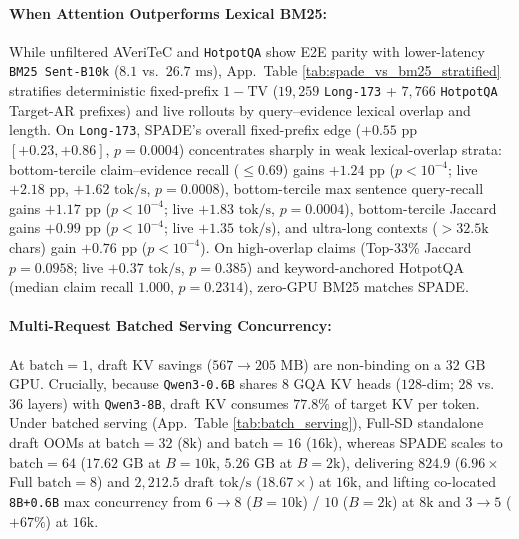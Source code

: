\documentclass[11pt]{article}
\begin{document}
\paragraph{When Attention Outperforms Lexical BM25:}
While unfiltered AVeriTeC and \texttt{HotpotQA} show E2E parity with lower-latency \texttt{BM25 Sent-B10k} ($8.1$ vs.\ $26.7\text{ ms}$), App.\ Table \ref{tab:spade_vs_bm25_stratified} stratifies deterministic fixed-prefix $1-\text{TV}$ ($19,259$ \texttt{Long-173} + $7,766$ \texttt{HotpotQA} Target-AR prefixes) and live rollouts by query--evidence lexical overlap and length. On \texttt{Long-173}, SPADE's overall fixed-prefix edge ($+0.55\text{ pp}$ $[+0.23, +0.86]$, $p=0.0004$) concentrates sharply in weak lexical-overlap strata: bottom-tercile claim--evidence recall ($\le 0.69$) gains $+1.24\text{ pp}$ ($p<10^{-4}$; live $+2.18\text{ pp}$, $+1.62\text{ tok/s}$, $p=0.0008$), bottom-tercile max sentence query-recall gains $+1.17\text{ pp}$ ($p<10^{-4}$; live $+1.83\text{ tok/s}$, $p=0.0004$), bottom-tercile Jaccard gains $+0.99\text{ pp}$ ($p<10^{-4}$; live $+1.35\text{ tok/s}$), and ultra-long contexts ($>32.5\text{k}$ chars) gain $+0.76\text{ pp}$ ($p<10^{-4}$). On high-overlap claims (Top-33\% Jaccard $p=0.0958$; live $+0.37\text{ tok/s}$, $p=0.385$) and keyword-anchored HotpotQA (median claim recall $1.000$, $p=0.2314$), zero-GPU BM25 matches SPADE.

\paragraph{Multi-Request Batched Serving Concurrency:}
At $\text{batch}=1$, draft KV savings ($567 \to 205\text{ MB}$) are non-binding on a $32\text{ GB}$ GPU. Crucially, because \texttt{Qwen3-0.6B} shares $8$ GQA KV heads ($128$-dim; $28$ vs.\ $36$ layers) with \texttt{Qwen3-8B}, draft KV consumes $77.8\%$ of target KV per token. Under batched serving (App.\ Table \ref{tab:batch_serving}), Full-SD standalone draft OOMs at $\text{batch}=32$ ($8\text{k}$) and $\text{batch}=16$ ($16\text{k}$), whereas SPADE scales to $\text{batch}=64$ ($17.62\text{ GB}$ at $B=10\text{k}$, $5.26\text{ GB}$ at $B=2\text{k}$), delivering $824.9$ ($6.96\times$ Full $\text{batch}=8$) and $2,212.5\text{ draft tok/s}$ ($18.67\times$) at $16\text{k}$, and lifting co-located \texttt{8B+0.6B} max concurrency from $6 \to 8$ ($B=10\text{k}$) / $10$ ($B=2\text{k}$) at $8\text{k}$ and $3 \to 5$ ($+67\%$) at $16\text{k}$.
\end{document}

